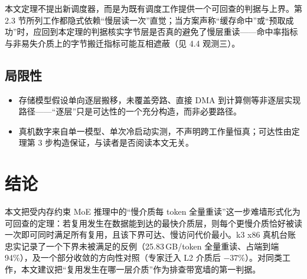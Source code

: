 \documentclass[11pt]{ctexart}
\begin{document}
本文定理不提出新调度器，而是为既有调度工作提供一个可回查的判据与上界。第 2.3 节所列工作\cite{paged,flightllm,cxlspeckv,fastkv}都隐式依赖“慢层读一次”直觉；当方案声称“缓存命中”或“预取成功”时，应回到本定理的判据核实字节层是否真的避免了慢层重读——命中率指标与非易失介质上的字节搬迁指标可能互相遮蔽（见 4.4 观测三）。

\subsection{局限性}

\begin{itemize}
\item 存储模型假设单向逐层搬移，未覆盖旁路、直接 DMA 到计算侧等非逐层实现路径——“逐层”只是可达性的一个充分构造，而非必要路径。
\item 真机数字来自单一模型、单次冷启动实测，不声明跨工作量恒真；可达性由定理第 3 步构造保证，与读者是否阅读本文无关。
\end{itemize}

\section{结论}

本文把受内存约束 MoE 推理中的“慢介质每 token 全量重读”这一步难墙形式化为可回查的定理：若复用发生在数据能到达的最快介质层，则每个更慢介质恰好被读一次即可同时满足所有复用，且该下界可达、慢访问代价最小。k3 x86 真机台账忠实记录了一个下界未被满足的反例（25.83\,GB/token 全量重读、占端到端 94\%），及一个部分收敛的方向性对照（专家迁入 L2 介质后 $-37\%$）。对同类工作，本文建议把“复用发生在哪一层介质”作为排查带宽墙的第一判据。
\end{document}
